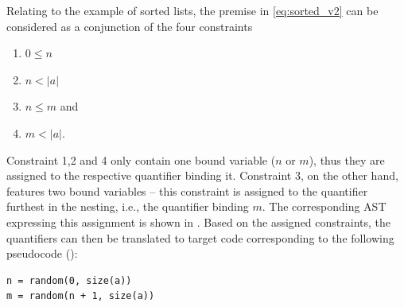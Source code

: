 Relating to the example of sorted lists, the premise in \eqref{eq:sorted_v2} can be considered as a conjunction of the four constraints
\begin{enumerate}
\itemsep-1em
\item $0 \leq n$
\item $n < |a| $
\item $n \le m$ and
\item $m < |a|$.
\end{enumerate}
Constraint 1,2 and 4 only contain one bound variable ($n$ or $m$), thus they are assigned to the respective quantifier binding it. Constraint 3, on the other hand, features two bound variables -- this constraint is assigned to the quantifier furthest in the nesting, i.e., the quantifier binding $m$. The corresponding AST expressing this assignment is shown in . Based on the assigned constraints, the quantifiers can then be translated to target code corresponding to the following pseudocode ():
\begin{lstlisting}[label=lst:rand, caption=Random generators for sorted list assertion, numbers=none]
n = random(0, size(a))
m = random(n + 1, size(a))
\end{lstlisting}

